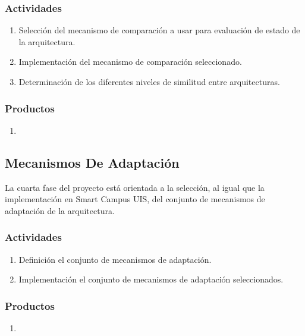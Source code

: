 \subsubsection*{Actividades}

\begin{enumerate}
    \itemsep-2mm
    \item Selección del mecanismo de comparación a usar para evaluación de estado de la arquitectura.
    \item Implementación del mecanismo de comparación seleccionado.
    \item Determinación de los diferentes niveles de similitud entre arquitecturas.
\end{enumerate}    

\subsubsection*{Productos}

\begin{enumerate}
    \itemsep-2mm
    \item 
\end{enumerate}

\subsection{Mecanismos De Adaptación}

La cuarta fase del proyecto está orientada a la selección, al igual que la implementación en Smart Campus UIS, del conjunto de mecanismos de adaptación de la arquitectura. 

\subsubsection*{Actividades}

\begin{enumerate}
    \itemsep-2mm
    \item Definición el conjunto de mecanismos de adaptación.
    \item Implementación el conjunto de mecanismos de adaptación seleccionados.
\end{enumerate}  

\subsubsection*{Productos}

\begin{enumerate}
    \itemsep-2mm
    \item 
\end{enumerate}

